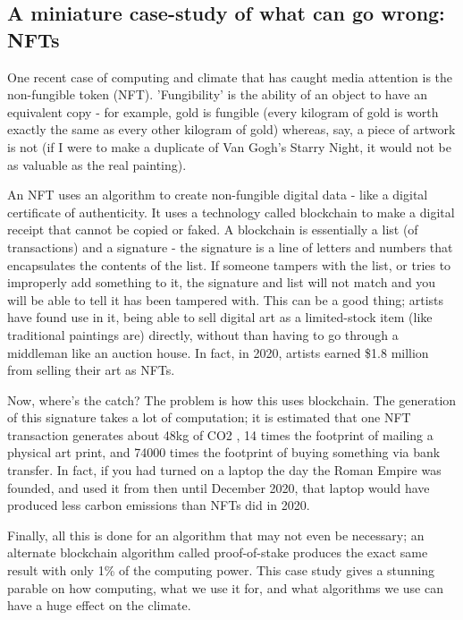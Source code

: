 \documentclass{article}
\begin{document}
\subsection{A miniature case-study of what can go wrong: NFTs}
One recent case of computing and climate that has caught media attention is the non-fungible token (NFT). 'Fungibility' is the ability of an object to have an equivalent copy - for example, gold is fungible (every kilogram of gold is worth exactly the same as every other kilogram of gold) whereas, say, a piece of artwork is not (if I were to make a duplicate of Van Gogh's Starry Night, it would not be as valuable as the real painting). \newline

An NFT uses an algorithm to create non-fungible digital data - like a digital certificate of authenticity. It uses a technology called blockchain to make a digital receipt that cannot be copied or faked. A blockchain is essentially a list (of transactions) and a signature - the signature is a line of letters and numbers that encapsulates the contents of the list. If someone tampers with the list, or tries to improperly add something to it, the signature and list will not match and you will be able to tell it has been tampered with.\citep{narayanan2017bitcoin} This can be a good thing; artists have found use in it, being able to sell digital art as a limited-stock item (like traditional paintings are) directly, without than having to go through a middleman like an auction house. In fact, in 2020,  artists earned \$1.8 million \citep{redman2020NFT} from selling their art as NFTs.\newline

Now, where's the catch? The problem is how this uses blockchain. The generation of this signature takes a lot of computation; it is estimated that one NFT transaction generates about 48kg of CO2 \citep{atken2020unreasonable}, 14 times the footprint of mailing a physical art print, and 74000 times the footprint of buying something via bank transfer. \citep{qiu2021what} In fact, if you had turned on a laptop the day the Roman Empire was founded, and used it from then until December 2020, that laptop would have produced less carbon emissions than NFTs did in 2020. \citep{atken2020unreasonable} \newline

Finally, all this is done for an algorithm that may not even be necessary; an alternate blockchain algorithm called proof-of-stake produces the exact same result with only 1\% of the computing power. \citep{saleh2021blockchain} This case study gives a stunning parable on how computing, what we use it for, and what algorithms we use can have a huge effect on the climate.
\end{document}

